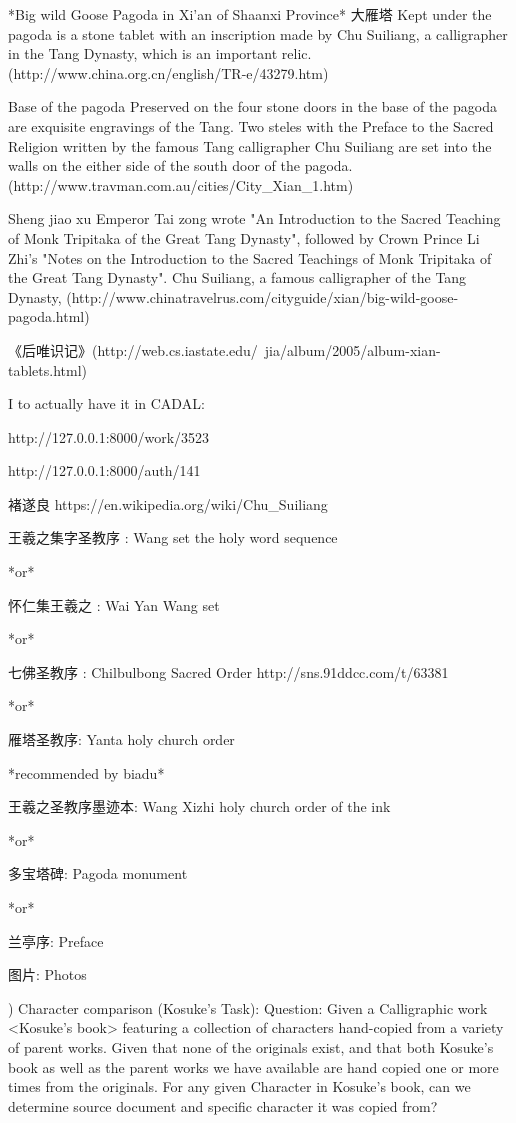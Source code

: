 *Big wild Goose Pagoda in Xi'an of Shaanxi Province* 大雁塔
Kept under the pagoda is a stone tablet with an inscription made by Chu Suiliang, a calligrapher in the Tang Dynasty, which is an important relic. (http://www.china.org.cn/english/TR-e/43279.htm)

Base of the pagoda
Preserved on the four stone doors in the base of the pagoda are exquisite engravings of the Tang. Two steles with the Preface to the Sacred Religion written by the famous Tang calligrapher Chu Suiliang are set into the walls on the either side of the south door of the pagoda. (http://www.travman.com.au/cities/City_Xian_1.htm)

Sheng jiao xu
 Emperor Tai zong wrote "An Introduction to the Sacred Teaching of Monk Tripitaka of the Great Tang Dynasty", followed by Crown Prince Li Zhi's "Notes on the Introduction to the Sacred Teachings of Monk Tripitaka of the Great Tang Dynasty". Chu Suiliang, a famous calligrapher of the Tang Dynasty, (http://www.chinatravelrus.com/cityguide/xian/big-wild-goose-pagoda.html)

《后唯识记》(http://web.cs.iastate.edu/~jia/album/2005/album-xian-tablets.html)



I to actually have it in CADAL:

http://127.0.0.1:8000/work/3523

http://127.0.0.1:8000/auth/141

褚遂良
https://en.wikipedia.org/wiki/Chu_Suiliang


王羲之集字圣教序 : Wang set the holy word sequence

*or*

怀仁集王羲之 : Wai Yan Wang set

*or*

七佛圣教序 : Chilbulbong Sacred Order  http://sns.91ddcc.com/t/63381

*or*

雁塔圣教序: Yanta holy church order

*recommended by biadu*

王羲之圣教序墨迹本: Wang Xizhi holy church order of the ink

*or*

多宝塔碑: Pagoda monument

*or*

兰亭序: Preface

图片: Photos

)  Character comparison (Kosuke's Task):
    Question:   Given a Calligraphic work <Kosuke's book> featuring a collection of characters hand-copied from a variety of parent works.
                Given that none of the originals exist, and that both Kosuke's book as well as the parent works we have available are hand copied one or more times from the originals.
                For any given Character in Kosuke's book, can we determine source document and specific character it was copied from?
                
